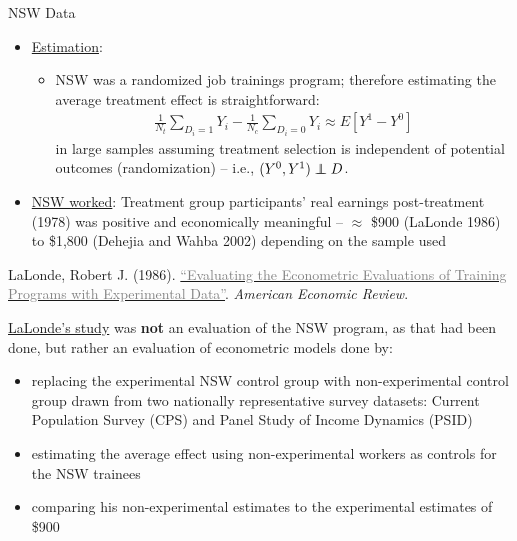 \documentclass{beamer}
\newcommand\independent{\protect\mathpalette{\protect\independenT}{\perp}}
\def\independenT#1#2{\mathrel{\rlap{$#1#2$}\mkern2mu{#1#2}}}
\newcommand{\myurlshort}[2]{\href{#1}{\textcolor{gray}{\textsf{#2}}}}
\begin{document}
\begin{frame}{NSW Data}

\begin{itemize}
	\item \underline{Estimation}:
		\begin{itemize}
		\item NSW was a randomized job trainings program; therefore estimating the average treatment effect is straightforward:
			\begin{eqnarray*}
			\frac{1}{N_t}\sum_{D_i=1}Y_i - \frac{1}{N_c}\sum_{D_i=0}Y_i \approx E[Y^1-Y^0] 
			\end{eqnarray*}in large samples assuming treatment selection is independent of potential outcomes (randomization) -- i.e., $(Y^0,Y^1)\independent{D}$. 
		\end{itemize}
	\item \underline{NSW worked}: Treatment group participants' real earnings post-treatment (1978) was positive and economically meaningful -- $\approx$ \$900 (LaLonde 1986) to \$1,800 (Dehejia and Wahba 2002) depending on the sample used
\end{itemize}

\end{frame}
	
\begin{frame}[plain]
	\begin{center}
	LaLonde, Robert J. (1986). \myurlshort{http://business.baylor.edu/scott_cunningham/teaching/lalonde-1986.pdf}{``Evaluating the Econometric Evaluations of Training Programs with Experimental Data''}. \emph{American Economic Review}. 
	\end{center}
	
\underline{LaLonde's study} was \textbf{not} an evaluation of the NSW program, as that had been done, but rather an evaluation of econometric models done by:
		\begin{itemize}
		\item replacing the experimental NSW control group with non-experimental control group drawn from two nationally representative survey datasets: Current Population Survey (CPS) and Panel Study of Income Dynamics (PSID)
		\item estimating the average effect using non-experimental workers as controls for the NSW trainees 
		\item comparing his non-experimental estimates to the experimental estimates of \$900
		\end{itemize}
\end{frame}
\end{document}
